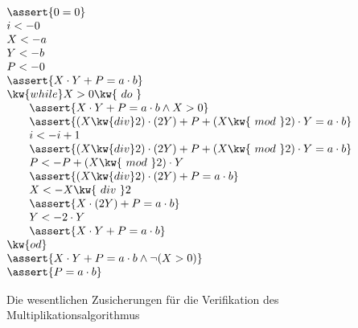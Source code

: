 \begin{figure}[ht]
  \centering

  $\begin{aligned}
    & \assert{0=0} \\[-1mm]
    & i <- 0 \\[-1mm]
    & X <- a \\[-1mm]
    & Y <- b \\[-1mm]
    & P <- 0 \\[-1mm]
    & \assert{X\cdot Y +P = a\cdot b} \\[-1mm] %
    & \kw{while } X>0 \kw{\ do\ } \\[-1mm]
    & \qquad \assert{X\cdot Y +P = a\cdot b \land X>0} \\[-1mm]
    & \qquad \assert{(X\kw{ div }2)\cdot (2Y) +P + (X \kw{\ mod\ } 2) \cdot Y = a\cdot b} \\[-1mm]
    & \qquad  i <- i+1 \\[-1mm]
    & \qquad \assert{(X\kw{ div }2)\cdot (2Y) +P + (X \kw{\ mod\ } 2) \cdot Y = a\cdot b} \\[-1mm]
    & \qquad  P <- P + (X \kw{\ mod\ } 2) \cdot Y \\[-1mm]
    & \qquad \assert{(X\kw{ div }2)\cdot (2Y) +P = a\cdot b} \\[-1mm]
    & \qquad  X <- X \kw{\ div\ } 2 \\[-1mm]
    & \qquad \assert{X\cdot (2Y) +P = a\cdot b} \\[-1mm]
    & \qquad  Y <- 2\cdot Y \\[-1mm]
    & \qquad \assert{X\cdot Y +P = a\cdot b} \\[-1mm]
    & \kw{od} \\[-1mm]
    & \assert{X\cdot Y +P = a\cdot b \land \lnot (X>0)} \\[-1mm]
    & \assert{P=a\cdot b}
  \end{aligned}$ 
  \caption{Die wesentlichen Zusicherungen für die Verifikation des
    Multiplikationsalgorithmus}
  \label{fig:mult-invariante}
\end{figure}
%
